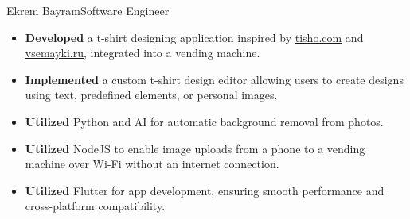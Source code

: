 \documentclass{article}
\begin{document}
\begin{cv}[avatar]{Ekrem Bayram}{Software Engineer}
    \cvseparator[2]
    \begin{cvevent}[2022]
        \begin{itemize}
            \item \textbf{Developed} a t-shirt designing application inspired by \href{https://www.tisho.com}{\uline{tisho.com}} and \href{https://www.vsemayki.ru}{\uline{vsemayki.ru}}, integrated into a vending machine.
            \item \textbf{Implemented} a custom t-shirt design editor allowing users to create designs using text, predefined elements, or personal images.
            \item \textbf{Utilized} Python and AI for automatic background removal from photos.
            \item \textbf{Utilized} NodeJS to enable image uploads from a phone to a vending machine over Wi-Fi without an internet connection.
            \item \textbf{Utilized} Flutter for app development, ensuring smooth performance and cross-platform compatibility.
        \end{itemize}
    \end{cvevent}


\end{cv}
\end{document}
